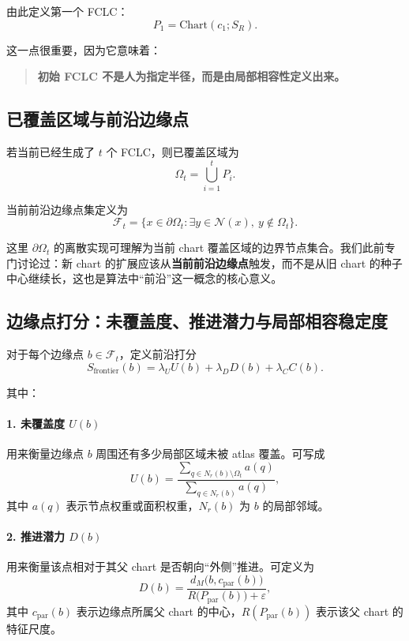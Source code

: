 \documentclass[12pt,a4paper]{ctexart}
\begin{document}
由此定义第一个 FCLC：
\[
P_1=\mathrm{Chart}(c_1;S_R).
\]

这一点很重要，因为它意味着：

\begin{quote}
\textbf{初始 FCLC 不是人为指定半径，而是由局部相容性定义出来。}
\end{quote}

\subsection{已覆盖区域与前沿边缘点}

若当前已经生成了 \(t\) 个 FCLC，则已覆盖区域为
\[
\Omega_t=\bigcup_{i=1}^{t}P_i.
\]

当前前沿边缘点集定义为
\[
\mathcal F_t=
\{x\in\partial\Omega_t:\exists y\in\mathcal N(x),\ y\notin\Omega_t\}.
\]

这里 \(\partial\Omega_t\) 的离散实现可理解为当前 chart 覆盖区域的边界节点集合。我们此前专门讨论过：新 chart 的扩展应该从\textbf{当前前沿边缘点}触发，而不是从旧 chart 的种子中心继续长，这也是算法中“前沿”这一概念的核心意义。

\subsection{边缘点打分：未覆盖度、推进潜力与局部相容稳定度}

对于每个边缘点 \(b\in\mathcal F_t\)，定义前沿打分
\[
S_{\mathrm{frontier}}(b)
=
\lambda_U U(b)
+
\lambda_D D(b)
+
\lambda_C C(b).
\]

其中：

\paragraph{1. 未覆盖度 \(U(b)\)}
用来衡量边缘点 \(b\) 周围还有多少局部区域未被 atlas 覆盖。可写成
\[
U(b)
=
\frac{
\sum_{q\in N_r(b)\setminus\Omega_t} a(q)
}{
\sum_{q\in N_r(b)} a(q)
},
\]
其中 \(a(q)\) 表示节点权重或面积权重，\(N_r(b)\) 为 \(b\) 的局部邻域。

\paragraph{2. 推进潜力 \(D(b)\)}
用来衡量该点相对于其父 chart 是否朝向“外侧”推进。可定义为
\[
D(b)
=
\frac{
d_M\big(b,c_{\mathrm{par}}(b)\big)
}{
R\big(P_{\mathrm{par}}(b)\big)+\varepsilon
},
\]
其中 \(c_{\mathrm{par}}(b)\) 表示边缘点所属父 chart 的中心，\(R(P_{\mathrm{par}}(b))\) 表示该父 chart 的特征尺度。
\end{document}
